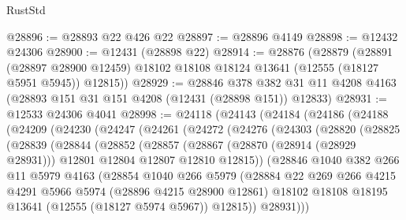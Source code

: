 \begin{lexlean}{RustStd}
\begin{coremodule}
@28896 := @28893 @22 @426 @22
@28897 := @28896 @4149
@28898 := @12432 @24306
@28900 := @12431 (@28898 @22)
@28914 := @28876
    (@28879
      (@28891
        (@28897 @28900 @12459)
        @18102
        @18108
        @18124
        @13641
        (@12555 (@18127 @5951 @5945))
        @12815))
@28929 := @28846
    @378
    @382
    @31
    @11
    @4208
    @4163
    (@28893 @151 @31 @151 @4208 (@12431 (@28898 @151)) @12833)
@28931 := @12533 @24306 @4041
@28998 := @24118
    (@24143
      (@24184
        (@24186
          (@24188
            (@24209
              (@24230
                (@24247
                  (@24261
                    (@24272
                      (@24276
                        (@24303
                          (@28820
                            (@28825
                              (@28839
                                (@28844
                                  (@28852
                                    (@28857
                                      (@28867
                                        (@28870 (@28914 (@28929 @28931)))
                                        @12801
                                        @12804
                                        @12807
                                        @12810
                                        @12815))
                                    (@28846
                                      @1040
                                      @382
                                      @266
                                      @11
                                      @5979
                                      @4163
                                      (@28854
                                        @1040
                                        @266
                                        @5979
                                        (@28884
                                          @22
                                          @269
                                          @266
                                          @4215
                                          @4291
                                          @5966
                                          @5974
                                          (@28896 @4215 @28900 @12861)
                                          @18102
                                          @18108
                                          @18195
                                          @13641
                                          (@12555 (@18127 @5974 @5967))
                                          @12815))
                                      @28931)))

\end{coremodule}
\end{lexlean}
